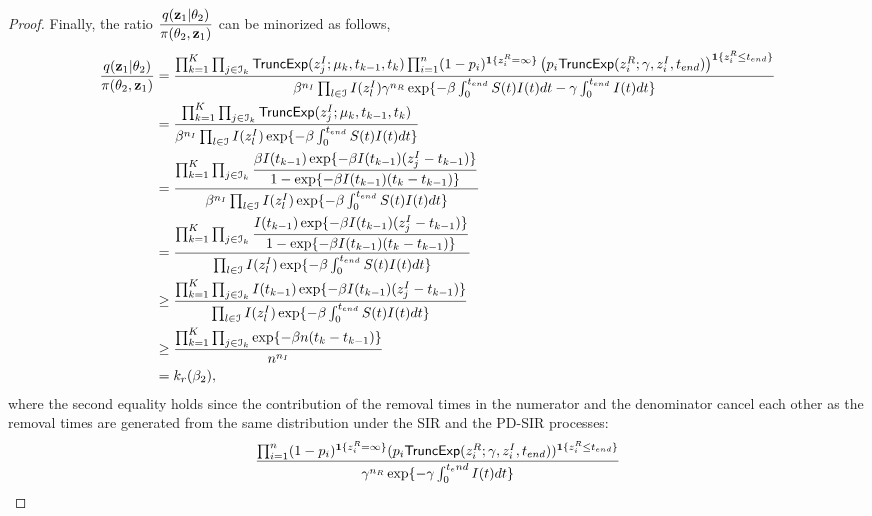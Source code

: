 \documentclass[11pt]{article}
\newcommand{\ram}[1]{{\color{green}{ #1}}}
\begin{document}
\begin{proof}
		Finally, the ratio $\dfrac{q(\mathbf{z}_1|\theta_2)}{\pi(\theta_2, \mathbf{z}_1)}$ can be minorized as follows, \ram{(in the second inequality, minimize the whole numerator in terms of $I(.)$ instead of its each factors (=> use previous proof minimizing the proposal density); this will provide a better bound)}
		\begin{align*}
		    \dfrac{q(\mathbf{z}_1|\theta_2)}{\pi(\theta_2, \mathbf{z}_1)} 
		    & = \dfrac{\prod_{k=1}^K \prod_{j\in \mathcal{I}_k} \textsf{TruncExp}(z^I_j; \mu_k, t_{k-1}, t_k) \prod_{i=1}^n (1-p_i)^{\mathbf{1}\{z^R_i=\infty\}} \left(p_i \textsf{TruncExp}(z^R_i;\gamma, z^I_i, t_{end})\right)^{\mathbf{1}\{z^R_i \le t_{end}\}}}
        	{\beta^{n_I} \prod_{l\in \mathcal{I}} I(z^I_l) \gamma^{n_R} \exp\{-\beta \int_0^{t_{end}} S(t)I(t)dt -\gamma \int_0^{t_{end}} I(t)dt\}} \\
        	& = \dfrac{\prod_{k=1}^K \prod_{j\in \mathcal{I}_k} \textsf{TruncExp}(z^I_j; \mu_k, t_{k-1}, t_k)}
        	{\beta^{n_I} \prod_{l\in \mathcal{I}} I(z^I_l) \exp\{-\beta \int_0^{t_{end}} S(t)I(t)dt\}}\\
        	& = \dfrac{\prod_{k=1}^K \prod_{j\in \mathcal{I}_k} \dfrac{\beta I(t_{k-1}) \exp\{-\beta I(t_{k-1}) (z^I_j - t_{k-1})\}}{1-\exp\{-\beta I(t_{k-1})(t_k - t_{k-1})\}}}
        	{\beta^{n_I} \prod_{l\in \mathcal{I}} I(z^I_l) \exp\{-\beta \int_0^{t_{end}} S(t)I(t)dt\}}\\
        	& = \dfrac{\prod_{k=1}^K \prod_{j\in \mathcal{I}_k} \dfrac{I(t_{k-1}) \exp\{-\beta I(t_{k-1}) (z^I_j - t_{k-1})\}}{1-\exp\{-\beta I(t_{k-1})(t_k - t_{k-1})\}}}
        	{\prod_{l\in \mathcal{I}} I(z^I_l) \exp\{-\beta \int_0^{t_{end}} S(t)I(t)dt\}}\\
        	& \ge \dfrac{\prod_{k=1}^K \prod_{j\in \mathcal{I}_k} I(t_{k-1}) \exp\{-\beta I(t_{k-1}) (z^I_j - t_{k-1})\}}
        	{\prod_{l\in \mathcal{I}} I(z^I_l) \exp\{-\beta \int_0^{t_{end}} S(t)I(t)dt\}}\\
        	& \ge \dfrac{\prod_{k=1}^K \prod_{j\in \mathcal{I}_k} \exp\{-\beta n (t_k - t_{k-1})\}}
        	{n^{n_I}}\\
        	& = k_r(\beta_2),
		\end{align*}
		where the second equality holds since the	contribution of the removal times in the numerator and the denominator cancel each other as the removal times are generated from the same distribution under the SIR and the PD-SIR processes:
        \begin{align*}
        	& \dfrac{\prod_{i=1}^n (1-p_i)^{\mathbf{1}\{z^R_i=\infty\}} (p_i \TruncExp(z^R_i;\gamma, z^I_i, t_{end}))^{\mathbf{1}\{z^R_i \le t_{end}\}}}{\gamma^{n_R} \exp\{- \gamma \int_0^{t_end} I(t)dt\}} \\

\end{align*}
\end{proof}
\end{document}
